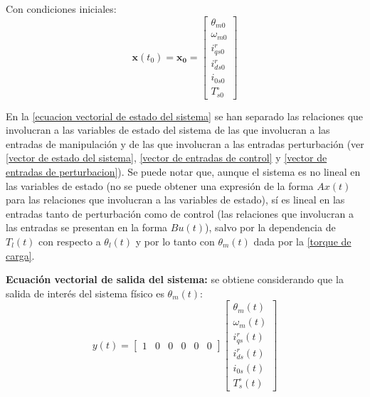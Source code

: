 \documentclass[a4paper, 10pt, onecolumn,journal]{ieeeconf}
\begin{document}
Con condiciones iniciales:
\begin{equation}
    \mathbf{x}(t_0) = \mathbf{x_0}
    =
    \begin{bmatrix} 
        \theta_{m0} \\ 
        \omega_{m0} \\ 
        i^r_{qs0} \\ 
        i^r_{ds0} \\ 
        i_{0s0} \\ 
        T^\circ_{s0} 
    \end{bmatrix}
\end{equation}

En la \cref{ecuacion vectorial de estado del sistema} se han separado
las relaciones que involucran a las variables de estado del sistema de las que involucran a las 
entradas de manipulación y de las que involucran a las entradas perturbación (ver \cref{vector de estado del sistema}, \cref{vector de entradas de control} y \cref{vector de entradas de perturbacion}). Se puede notar
que, aunque el sistema es no lineal en las variables de estado (no se puede obtener una expresión de la forma $Ax(t)$ para las relaciones que involucran a las variables de estado), 
sí es lineal en las entradas tanto de perturbación como de control (las relaciones que involucran a las entradas se presentan en la forma $Bu(t)$), salvo por la dependencia de $T_l(t)$ con respecto a $\theta_l(t)$ y por lo tanto con $\theta_m(t)$ 
dada por la \cref{torque de carga}.

\textbf{Ecuación vectorial de salida del sistema:} se obtiene considerando que la salida de interés del sistema físico es $\theta_m(t)$:
\begin{equation}
    y(t) = 
    \begin{bmatrix}
        1 & 0 & 0 & 0 & 0 & 0
    \end{bmatrix}
    \begin{bmatrix} \theta_m(t) \\ \omega_m(t) \\ i^r_{qs}(t) \\ i^r_{ds}(t) \\ i_{0s}(t) \\ T^\circ_s(t) \end{bmatrix}
    \label{ecuacion vectorial de salida del sistema}
\end{equation}
\end{document}
